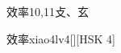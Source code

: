 \begin{entry}{效率}{10,11}{⽁、⽞}
  \begin{phonetics}{效率}{xiao4lv4}[][HSK 4]
  \end{phonetics}
\end{entry}
